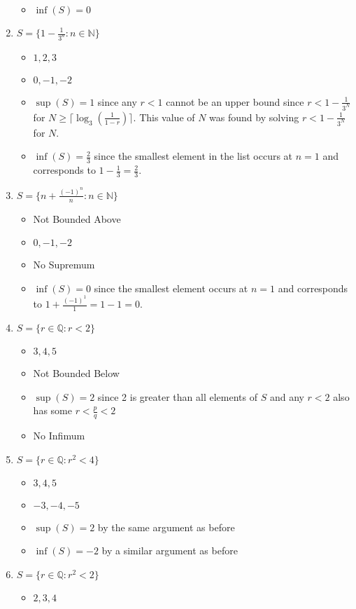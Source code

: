 \documentclass[10pt,a4paper]{article}
\theoremstyle{definition}
\begin{document}
\begin{enumerate}[label = (\alph*)]
\begin{itemize}
\item $\inf(S) = 0$
\end{itemize}
\item $S = \{1 - \frac{1}{3^n} : n \in \mathbb{N}\}$
\begin{itemize}
\item $1, 2, 3$
\item $0, -1, -2$
\item $\sup(S) = 1$ since any $r < 1$ cannot be an upper bound since $r < 1 - \frac{1}{3^N}$ for $N \geq \lceil\log_3(\frac{1}{1-r})\rceil$. This value of $N$ was found by solving $r < 1 - \frac{1}{3^N}$ for $N$. 
\item $\inf(S) = \frac{2}{3}$ since the smallest element in the list occurs at $n = 1$ and corresponds to $1 - \frac{1}{3} = \frac{2}{3}$.
\end{itemize}
\item $S = \{n + \frac{(-1)^n}{n} : n \in \mathbb{N}\}$
\begin{itemize}
\item Not Bounded Above
\item $0, -1, -2$
\item No Supremum
\item $\inf(S) = 0$ since the smallest element occurs at $n = 1$ and corresponds to $1 + \frac{(-1)^1}{1} = 1 - 1 =0$.
\end{itemize}
\item $S = \{r \in \mathbb{Q} : r < 2\}$
\begin{itemize}
\item $3, 4, 5$
\item Not Bounded Below
\item $\sup(S) = 2$ since 2 is greater than all elements of $S$ and any $r < 2$ also has some $r < \frac{p}{q} < 2$
\item No Infimum
\end{itemize}
\item $S = \{r \in \mathbb{Q} : r^2 < 4\}$
\begin{itemize}
\item $3, 4, 5$
\item $-3, -4, -5$
\item $\sup(S) = 2$ by the same argument as before
\item $\inf(S) = -2$ by a similar argument as before
\end{itemize}
\item $S = \{r \in \mathbb{Q} : r^2 < 2\}$
\begin{itemize}
\item $2, 3, 4$

\end{itemize}
\end{enumerate}
\end{document}
